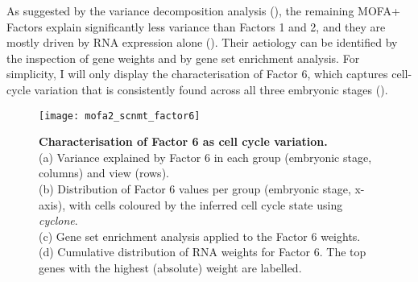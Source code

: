 As suggested by the variance decomposition analysis (), the remaining MOFA+ Factors explain significantly less variance than Factors 1 and 2, and they are mostly driven by RNA expression alone (). Their aetiology can be identified by the inspection of gene weights and by gene set enrichment analysis. For simplicity, I will only display the characterisation of Factor 6, which captures cell-cycle variation that is consistently found across all three embryonic stages ().

\begin{figure}[H]
	\centering
	\texttt{[image: mofa2\_scnmt\_factor6]}
	\caption[]{
	\textbf{Characterisation of Factor 6 as cell cycle variation.} \\
	(a) Variance explained by Factor 6 in each group (embryonic stage, columns) and view (rows).\\
	(b) Distribution of Factor 6 values per group (embryonic stage, x-axis), with cells coloured by the inferred cell cycle state using \textit{cyclone}.\\
	(c) Gene set enrichment analysis applied to the Factor 6 weights.\\
	(d) Cumulative distribution of RNA weights for Factor 6. The top genes with the highest (absolute) weight are labelled.
	}
	\label{fig:mofa2_scnmt_factor6}
\end{figure}



